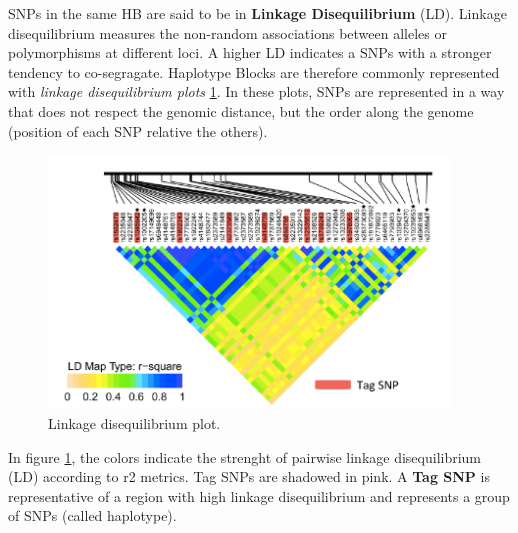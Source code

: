 SNPs in the same HB are said to be in \textbf{Linkage Disequilibrium} (LD).
Linkage disequilibrium measures the non-random associations between alleles or
polymorphisms at different loci. A higher LD indicates a SNPs with a stronger
tendency to co-segragate. Haplotype Blocks are therefore commonly represented
with \emph{linkage disequilibrium plots} \ref{fig:LD_plot}. In these plots, SNPs
are represented in a way that does not respect the genomic distance, but the
order along the genome (position of each SNP relative the others). \\

\begin{figure}[h]
	\centering
	\includegraphics[width=0.95\textwidth]{LD_plot.PNG}
	\caption{Linkage disequilibrium plot.} 
	\label{fig:LD_plot}
\end{figure}

In figure \ref{fig:LD_plot}, the colors indicate the strenght of pairwise
linkage disequilibrium (LD) according to r2 metrics. Tag SNPs are shadowed in
pink. A \textbf{Tag SNP} is representative of a region with high linkage
disequilibrium and represents a group of SNPs (called haplotype).


